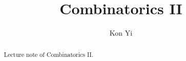 \documentclass[a4paper]{report}
\author{Kon Yi}
\title{Combinatorics II}
\begin{document}
\maketitle

\begin{abstract}
Lecture note of Combinatorics II.
\end{abstract}

\newpage

\tableofcontents


\newpage
\appendix
\appendixpage{}



\newpage
\pagestyle{plain}
\printbibliography{}
\end{document}
